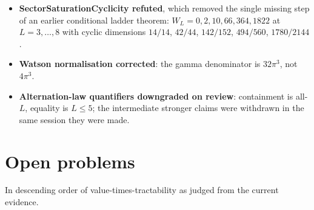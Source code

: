 \documentclass[11pt]{article}
\theoremstyle{definition}
\begin{document}
\begin{itemize}[leftmargin=*,itemsep=2pt]
      Corollary~\ref{cor:oa}.
\item \textbf{SectorSaturationCyclicity refuted}, which removed the single missing step of an earlier
      conditional ladder theorem: $W_L=0,2,10,66,364,1822$ at $L=3,\dots,8$ with cyclic dimensions
      $14/14$, $42/44$, $142/152$, $494/560$, $1780/2144$.
\item \textbf{Watson normalisation corrected}: the gamma denominator is $32\pi^3$, not $4\pi^3$.
\item \textbf{Alternation-law quantifiers downgraded on review}: containment is all-$L$, equality is
      $L\le5$; the intermediate stronger claims were withdrawn in the same session they were made.
\end{itemize}

\section{Open problems}\label{sec:open}
In descending order of value-times-tractability as judged from the current evidence.
\end{document}
